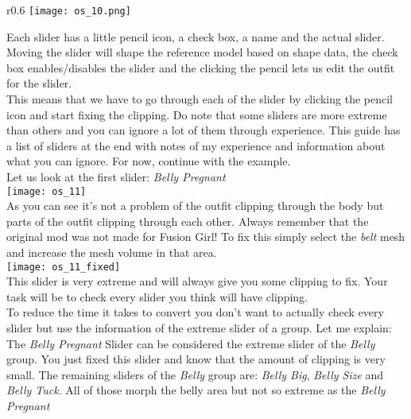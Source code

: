 \begin{wrapfigure}[12]{r}{0.6\textwidth}
    \vspace{-10pt}
    \texttt{[image: os\_10.png]}
\end{wrapfigure}
Each slider has a little pencil icon, a check box, a name and the actual slider. Moving the slider will shape the reference model 
based on shape data, the check box enables/disables the slider and the clicking the pencil lets us edit the outfit for the slider.\\
This means that we have to go through each of the slider by clicking the pencil icon and start fixing the clipping. Do note 
that some sliders are more extreme than others and you can ignore a lot of them through experience. This guide has a list of sliders 
at the end with notes of my experience and information about what you can ignore. For now, continue with the example.\\
\linebreak
\linebreak
\linebreak
\linebreak
\linebreak
Let us look at the first slider: \textit{Belly Pregnant}\\
\texttt{[image: os\_11]}\\
As you can see it's not a problem of the outfit clipping through the body but parts of the outfit clipping through each other. 
Always remember that the original mod was not made for Fusion Girl! To fix this simply select the \textit{belt} mesh and increase 
the mesh volume in that area.\\
\texttt{[image: os\_11\_fixed]}\\
This slider is very extreme and will always give you some clipping to fix. Your task will be to check every slider you think will have 
clipping.\\ To reduce the time it takes to convert you don't want to actually check every slider but use the information of the 
extreme slider of a group. Let me explain:\\
The \textit{Belly Pregnant} Slider can be considered the extreme slider of the \textit{Belly} group. You just fixed this slider and 
know that the amount of clipping is very small. The remaining sliders of the \textit{Belly} group are: \textit{Belly Big}, 
\textit{Belly Size} and \textit{Belly Tuck}. All of those morph the belly area but not so extreme as the \textit{Belly Pregnant} 
